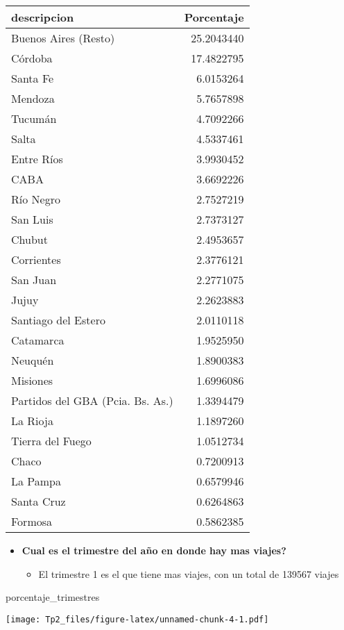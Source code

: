 \documentclass[
]{article}
\newenvironment{Shaded}{\begin{snugshade}}{\end{snugshade}}
\newcommand{\NormalTok}[1]{#1}
\providecommand{\tightlist}{%
  \setlength{\itemsep}{0pt}\setlength{\parskip}{0pt}}
\begin{document}
\begin{longtable}[]{@{}lr@{}}
\toprule()
descripcion & Porcentaje \\
\midrule()
\endhead
Buenos Aires (Resto) & 25.2043440 \\
Córdoba & 17.4822795 \\
Santa Fe & 6.0153264 \\
Mendoza & 5.7657898 \\
Tucumán & 4.7092266 \\
Salta & 4.5337461 \\
Entre Ríos & 3.9930452 \\
CABA & 3.6692226 \\
Río Negro & 2.7527219 \\
San Luis & 2.7373127 \\
Chubut & 2.4953657 \\
Corrientes & 2.3776121 \\
San Juan & 2.2771075 \\
Jujuy & 2.2623883 \\
Santiago del Estero & 2.0110118 \\
Catamarca & 1.9525950 \\
Neuquén & 1.8900383 \\
Misiones & 1.6996086 \\
Partidos del GBA (Pcia. Bs. As.) & 1.3394479 \\
La Rioja & 1.1897260 \\
Tierra del Fuego & 1.0512734 \\
Chaco & 0.7200913 \\
La Pampa & 0.6579946 \\
Santa Cruz & 0.6264863 \\
Formosa & 0.5862385 \\
\bottomrule()
\end{longtable}

\begin{itemize}
\item
  \textbf{Cual es el trimestre del año en donde hay mas viajes?}

  \begin{itemize}
  \tightlist
  \item
    El trimestre 1 es el que tiene mas viajes, con un total de 139567
    viajes
  \end{itemize}
\end{itemize}

\begin{Shaded}
\begin{Highlighting}[]
\NormalTok{porcentaje\_trimestres}
\end{Highlighting}
\end{Shaded}

\texttt{[image: Tp2\_files/figure-latex/unnamed-chunk-4-1.pdf]}
\end{document}
